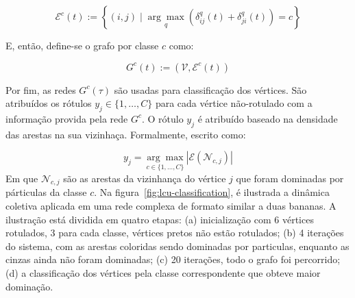 \begin{equation}\label{eq:lcu-edges-by-class}
  \mathcal{E}^c(t):=\left\{(i, j) \mid \underset{q}{\arg \max }\left(\delta_{i j}^q(t)+\delta_{j i}^q(t)\right)=c\right\}
\end{equation}

E, então, define-se o grafo por classe $c$ como:

\begin{equation}\label{eq:lcu-subnetworks}
  G^c(t):=\left(\mathcal{V}, \mathcal{E}^c(t)\right)
\end{equation}

Por fim, as redes $ G^c(\tau) $ são usadas para classificação dos
vértices. São atribuídos os rótulos $y_j \in \{1, \ldots, C\}$ para cada
vértice não-rotulado com a informação provida pela rede $G^c$.  O
rótulo $y_j$ é atribuído baseado na densidade das arestas na sua
vizinhaça. Formalmente, escrito como:

\begin{equation}\label{eq:lcu-vertex-classification}
y_j = \underset{c \in \{1, \ldots, C\}}{\arg \max }\left| \mathcal{E}(\mathcal{N}_{c,j}) \right|
\end{equation}
\noindent
Em que ${\mathcal{N}_{c,j}}$ são as arestas da vizinhança do vértice $j$ que
foram dominadas por párticulas da classe $c$. Na
figura~\ref{fig:lcu-classification}, é ilustrada a dinâmica coletiva
aplicada em uma rede complexa de formato similar a duas bananas. A
ilustração está dividida em quatro etapas: (a) inicialização com 6
vértices rotulados, 3 para cada classe, vértices pretos não estão
rotulados; (b) 4 iterações do sistema, com as arestas coloridas
sendo dominadas por particulas, enquanto as cinzas ainda não foram
dominadas; (c) 20 iterações, todo o grafo foi percorrido; (d) a
classificação dos vértices pela classe correspondente que obteve maior
dominação.

\begin{figure}[h!]
        \captionsetup{width=12cm}
		\centering
\end{figure}

